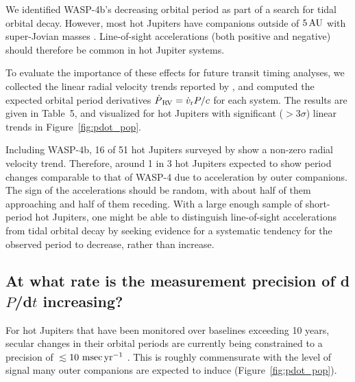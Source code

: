 \documentclass[12pt,twocolumn,tighten,trackchanges]{aastex62}
\begin{document}
We identified WASP-4b's decreasing orbital period as part of a search
for tidal orbital decay.  However, most hot Jupiters have companions
outside of $5\,{\rm AU}$ with super-Jovian masses
\citep{knutson_friends_2014,bryan_statistics_2016}.  Line-of-sight
accelerations (both positive and negative) should therefore be common
in hot Jupiter systems. 

To evaluate the importance of these effects for future transit timing
analyses, we collected the linear radial velocity trends reported by
\citet{knutson_friends_2014}, and computed the expected orbital period
derivatives $\dot{P}_{\rm\,RV} = \dot{v}_{\rm r} P/c$ for each system.
The results are given in Table~5, and visualized for hot Jupiters with
significant ($>$$3\sigma$) linear trends in Figure~\ref{fig:pdot_pop}.

Including WASP-4b, 16 of 51 hot Jupiters surveyed by
\citet{knutson_friends_2014} show a non-zero radial velocity trend.
Therefore, around 1 in 3 hot Jupiters  expected to
show period changes comparable to that of WASP-4 due to acceleration
by outer companions.  The sign of the accelerations should be random,
with about half of them approaching and half of them receding.  With a
large enough sample of short-period hot Jupiters, one might be able to
distinguish line-of-sight accelerations from tidal orbital decay by
seeking evidence for a systematic tendency for the observed period to
decrease, rather than increase.

\subsection{At what rate is the measurement precision of d$P$/d$t$
increasing?}
\label{sec:fisher}

For hot Jupiters that have been monitored over baselines exceeding 10
years, secular changes in their orbital periods are currently being
constrained to a precision of $\lesssim$$10~{\rm msec}\,{\rm yr}^{-1}$
\citep{wilkins_searching_2017,maciejewski_planet-star_2018,baluev_2019,petrucci_discarding_2020,patra_2020}.
This is roughly commensurate with the level of signal many outer
companions are expected to induce (Figure~\ref{fig:pdot_pop}).
\end{document}
